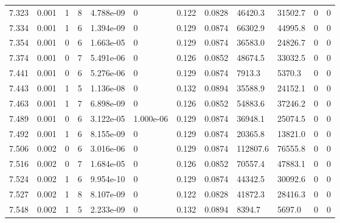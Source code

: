 \documentclass[preview]{standalone}
\begin{document}
{{{{{{{{\begin{tabular}{L{1.2cm}C{1.2cm} C{0.3cm}C{0.5cm} C{1.4cm}C{1.4cm} C{1.4cm}C{1.4cm} C{1.6cm}C{1.6cm} C{1.6cm}C{1.6cm}}
  7.323  &  0.001  & 1     &  8 &  4.788e-09  & 0  &  0.122&   0.0828& 46420.3 & 31502.7   &  0 & 0  \\ 
  7.334  &  0.001  & 1     &  6 &  1.394e-09  & 0  &  0.129&   0.0874& 66302.9 & 44995.8   &  0 & 0  \\ 
  7.354  &  0.001  & 0     &  6 &  1.663e-05  & 0  &  0.129&   0.0874& 36583.0 & 24826.7   &  0 & 0  \\ 
  7.374  &  0.001  & 0     &  7 &  5.491e-06  & 0  &  0.126&   0.0852& 48674.5 & 33032.5   &  0 & 0  \\ 
  7.441  &  0.001  & 0     &  6 &  5.276e-06  & 0  &  0.129&   0.0874& 7913.3 & 5370.3   &  0 & 0  \\ 
  7.443  &  0.001  & 1     &  5 &  1.136e-08  & 0  &  0.132&   0.0894& 35588.9 & 24152.1   &  0 & 0  \\ 
  7.463  &  0.001  & 1     &  7 &  6.898e-09  & 0  &  0.126&   0.0852& 54883.6 & 37246.2   &  0 & 0  \\ 
  7.489  &  0.001  & 0     &  6 &  3.122e-05  & 1.000e-06  &  0.129&   0.0874& 36948.1 & 25074.5   &  0 & 0  \\ 
  7.492  &  0.001  & 1     &  6 &  8.155e-09  & 0  &  0.129&   0.0874& 20365.8 & 13821.0   &  0 & 0  \\ 
  7.506  &  0.002  & 0     &  6 &  3.016e-06  & 0  &  0.129&   0.0874& 112807.6 & 76555.8   &  0 & 0  \\ 
  7.516  &  0.002  & 0     &  7 &  1.684e-05  & 0  &  0.126&   0.0852& 70557.4 & 47883.1   &  0 & 0  \\ 
  7.524  &  0.002  & 1     &  6 &  9.954e-10  & 0  &  0.129&   0.0874& 44342.5 & 30092.6   &  0 & 0  \\ 
  7.527  &  0.002  & 1     &  8 &  8.107e-09  & 0  &  0.122&   0.0828& 41872.3 & 28416.3   &  0 & 0  \\ 
  7.548  &  0.002  & 1     &  5 &  2.233e-09  & 0  &  0.132&   0.0894& 8394.7 & 5697.0   &  0 & 0  \\ 
\hline 
\end{tabular} 

}}}}}}}}
\end{document}
